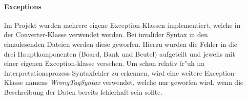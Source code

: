 \paragraph{Exceptions}
\label{par:exception}
Im Projekt wurden mehrere eigene Exception-Klassen implementiert, welche in der Converter-Klasse verwendet werden. Bei invalider Syntax in den einzulesenden Dateien werden diese geworfen. Hierzu wurden die Fehler in die drei Hauptkomponenten (Board, Bank und Beutel) aufgeteilt und jeweils mit einer eigenen Exception-klasse versehen. Um schon relativ fr"uh im Interpretationsprozess Syntaxfehler zu erkennen, wird eine weitere Exception-Klasse namens \emph{WrongTagSyntax} verwendet, welche nur geworfen wird, wenn die Beschreibung der Daten bereits fehlerhaft sein sollte. 